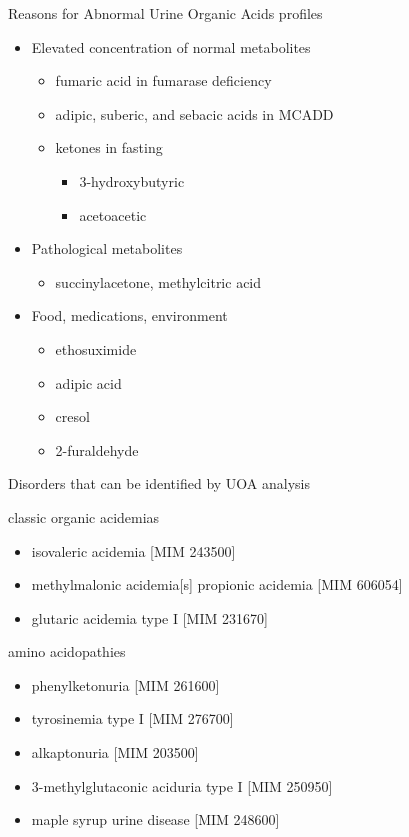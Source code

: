 \documentclass[presentation, smaller]{beamer}
\begin{document}
\begin{frame}[label={sec:org1dfbbf7}]{Reasons for Abnormal Urine Organic Acids profiles}
\begin{itemize}
\item Elevated concentration of normal metabolites
\begin{itemize}
\item fumaric acid in fumarase deficiency
\item adipic, suberic, and sebacic acids in MCADD
\item ketones in fasting
\begin{itemize}
\item 3-hydroxybutyric
\item acetoacetic
\end{itemize}
\end{itemize}

\item Pathological metabolites
\begin{itemize}
\item succinylacetone, methylcitric acid
\end{itemize}

\item Food, medications, environment
\begin{itemize}
\item ethosuximide
\item adipic acid
\item cresol
\item 2-furaldehyde
\end{itemize}
\end{itemize}
\end{frame}

\begin{frame}[label={sec:orgd93e5b6}]{Disorders that can be identified by UOA analysis}
\begin{block}{classic organic acidemias}
\begin{itemize}
\item isovaleric acidemia [MIM 243500]
\item methylmalonic acidemia[s] propionic acidemia [MIM 606054]
\item glutaric acidemia type I [MIM 231670]
\end{itemize}
\end{block}
\begin{block}{amino acidopathies}
\begin{itemize}
\item phenylketonuria [MIM 261600]
\item tyrosinemia type I [MIM 276700]
\item alkaptonuria [MIM 203500]
\item 3-methylglutaconic aciduria type I [MIM 250950]
\item maple syrup urine disease [MIM 248600]
\end{itemize}
\end{block}
\end{frame}
\end{document}
